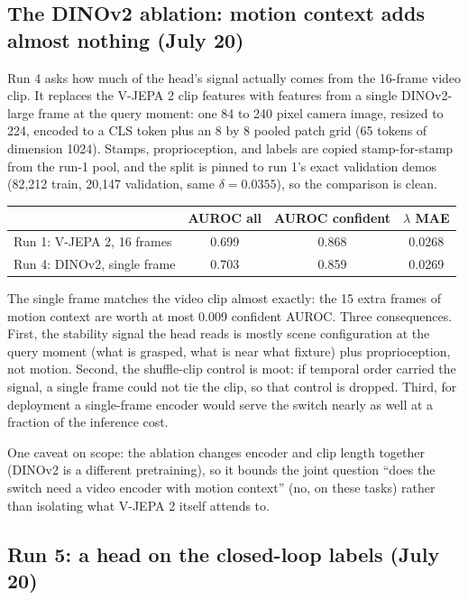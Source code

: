 \documentclass[11pt]{article}
\begin{document}
\subsection{The DINOv2 ablation: motion context adds almost nothing (July 20)}
\label{sec:dino}

Run 4 asks how much of the head's signal actually comes from the 16-frame video
clip. It replaces the V-JEPA 2 clip features with features from a single
DINOv2-large frame at the query moment: one 84 to 240 pixel camera image, resized
to 224, encoded to a CLS token plus an 8 by 8 pooled patch grid (65 tokens of
dimension 1024). Stamps, proprioception, and labels are copied stamp-for-stamp
from the run-1 pool, and the split is pinned to run 1's exact validation demos
(82{,}212 train, 20{,}147 validation, same $\delta = 0.0355$), so the comparison
is clean.

\begin{center}
\small
\begin{tabular}{@{}lccc@{}}
\toprule
 & AUROC all & AUROC confident & $\lambda$ MAE \\
\midrule
Run 1: V-JEPA 2, 16 frames   & 0.699 & 0.868 & 0.0268 \\
Run 4: DINOv2, single frame  & 0.703 & 0.859 & 0.0269 \\
\bottomrule
\end{tabular}
\end{center}

The single frame matches the video clip almost exactly: the 15 extra frames of
motion context are worth at most 0.009 confident AUROC. Three consequences.
First, the stability signal the head reads is mostly scene configuration at the
query moment (what is grasped, what is near what fixture) plus proprioception,
not motion. Second, the shuffle-clip control is moot: if temporal order carried
the signal, a single frame could not tie the clip, so that control is dropped.
Third, for deployment a single-frame encoder would serve the switch nearly as
well at a fraction of the inference cost.

One caveat on scope: the ablation changes encoder and clip length together
(DINOv2 is a different pretraining), so it bounds the joint question ``does the
switch need a video encoder with motion context'' (no, on these tasks) rather
than isolating what V-JEPA 2 itself attends to.

\subsection{Run 5: a head on the closed-loop labels (July 20)}
\label{sec:clhead}
\end{document}
